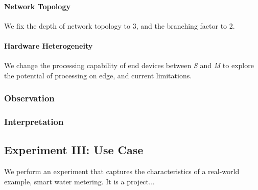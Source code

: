 \documentclass[runningheads]{llncs}
\newcommand{\legend}[2][]{
    \begin{scope}[#1]
    \path
        \foreach \n/\s in {#2}
            {
                  ++(0,-10pt) node[\s,legend box] {} +(5pt,0) node[legend label] {\n}
            }
    ;
    \end{scope}
}
\begin{document}
\paragraph{Network Topology}
We fix the depth of network topology to 3, and the branching factor to 2.

\paragraph{Hardware Heterogeneity}
We change the processing capability of end devices between \textit{S} and \textit{M} to explore the potential of processing on edge, and current limitations.

\subsubsection{Observation}

\subsubsection{Interpretation}

\subsection{Experiment III: Use Case}
We perform an experiment that captures the characteristics of a real-world example, smart water metering\cite{smart-metering}.
It is a project...

\end{document}
